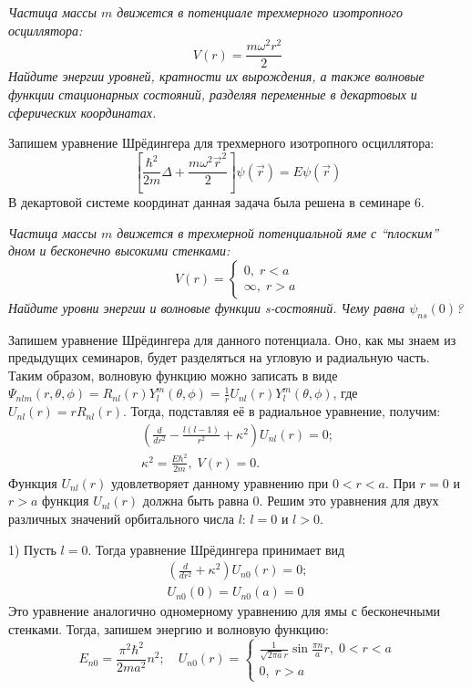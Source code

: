 \begin{center}
    \textit{Частица массы $m$ движется в потенциале трехмерного изотропного осциллятора:}
    \[
    V(r) = \frac{m\omega^2r^2}{2}
    \]
    \textit{Найдите энергии уровней, кратности их вырождения, а также волновые функции стационарных состояний, разделяя переменные в декартовых и сферических координатах.}
\end{center}
Запишем уравнение Шрёдингера для трехмерного изотропного осциллятора:
\[
\left[\frac{\hbar^2}{2m}\Delta + \frac{m\omega^2\Vec{r}^2}{2}\right]\psi(\Vec{r}) = E\psi(\Vec{r})
\]
В декартовой системе координат данная задача была решена в семинаре 6.

\begin{center}
    \textit{Частица массы $m$ движется в трехмерной потенциальной яме с ``плоским'' дном и бесконечно высокими стенками:}
    \[
    V(r)=
    \begin{cases}
        0,\; r<a\\
        \infty, \; r>a
    \end{cases}
    \]
    \textit{Найдите уровни энергии и волновые функции s-состояний. Чему равна $\psi_{ns}(0)$?}
\end{center}
Запишем уравнение Шрёдингера для данного потенциала. Оно, как мы знаем из предыдущих семинаров, будет разделяться на угловую и радиальную часть. Таким образом, волновую функцию можно записать в виде $\Psi_{nlm}(r, \theta, \phi) = R_{nl}(r)Y^{m}_l(\theta, \phi) = \frac{1}{r}U_{nl}(r)Y^{m}_l(\theta, \phi)$, где $U_{nl}(r) = rR_{nl}(r)$. Тогда, подставляя её в радиальное уравнение, получим:
\begin{gather*}
\left(\frac{d}{dr^2} - \frac{l(l-1)}{r^2} + \kappa^2\right)U_{nl}(r) = 0;\\ 
\kappa^2 = \frac{E\hbar^2}{2m},\; V(r) = 0.
\end{gather*}
Функция $U_{nl}(r)$ удовлетворяет данному уравнению при $ 0 < r < a$. При $r = 0$ и $r > a$ функция $U_{nl}(r)$ должна быть равна 0. Решим это уравнения для двух различных значений орбитального числа $l$: $l = 0$ и $l>0$.

1) Пусть $l = 0$. Тогда уравнение Шрёдингера принимает вид 
\begin{gather*}
\left(\frac{d}{dr^2} + \kappa^2\right)U_{n0}(r) = 0;\\
U_{n0}(0) = U_{n0}(a) = 0
\end{gather*}
Это уравнение аналогично одномерному уравнению для ямы с бесконечными стенками. Тогда, запишем энергию и волновую функцию:
\[
E_{n0} = \frac{\pi^2\hbar^2}{2ma^2}n^2;\quad U_{n0}(r) =
\begin{cases}
    \frac{1}{\sqrt{2\pi a}r}\sin\frac{\pi n}{a}r, \; 0 < r < a\\
    0, \; r > a
\end{cases}
\]

